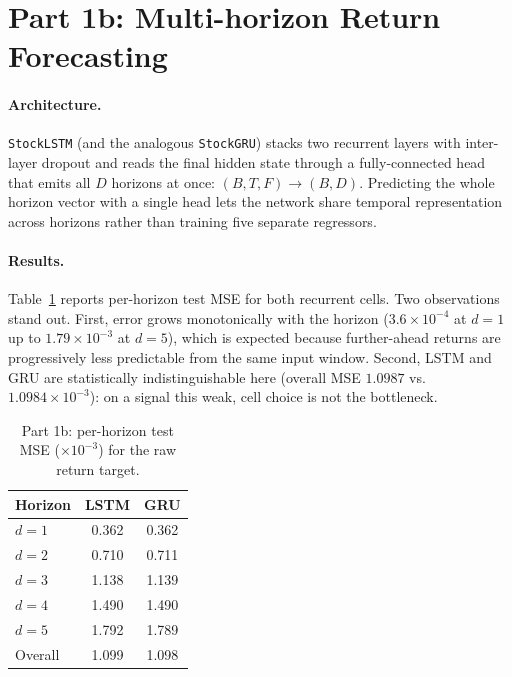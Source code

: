 \documentclass[10pt,twocolumn]{article}
\begin{document}
\section{Part 1b: Multi-horizon Return Forecasting}
\paragraph{Architecture.} \texttt{StockLSTM} (and the analogous
\texttt{StockGRU}) stacks two recurrent layers with inter-layer dropout and reads
the final hidden state through a fully-connected head that emits all $D$ horizons
at once: $(B,T,F)\!\rightarrow\!(B,D)$. Predicting the whole horizon vector with a
single head lets the network share temporal representation across horizons rather
than training five separate regressors.

\paragraph{Results.} Table~\ref{tab:returns} reports per-horizon test MSE for both
recurrent cells. Two observations stand out. First, error grows monotonically with
the horizon ($3.6\times10^{-4}$ at $d{=}1$ up to $1.79\times10^{-3}$ at $d{=}5$),
which is expected because further-ahead returns are progressively less
predictable from the same input window. Second, LSTM and GRU are statistically
indistinguishable here (overall MSE $1.0987$ vs.\ $1.0984\times10^{-3}$): on a
signal this weak, cell choice is not the bottleneck.

\begin{table}[t]
\centering
\caption{Part 1b: per-horizon test MSE ($\times10^{-3}$) for the raw return
target.}
\label{tab:returns}
\begin{tabular}{lcc}
\toprule
Horizon & LSTM & GRU \\
\midrule
$d{=}1$ & 0.362 & 0.362 \\
$d{=}2$ & 0.710 & 0.711 \\
$d{=}3$ & 1.138 & 1.139 \\
$d{=}4$ & 1.490 & 1.490 \\
$d{=}5$ & 1.792 & 1.789 \\
\midrule
Overall & 1.099 & 1.098 \\
\bottomrule
\end{tabular}
\end{table}
\end{document}
